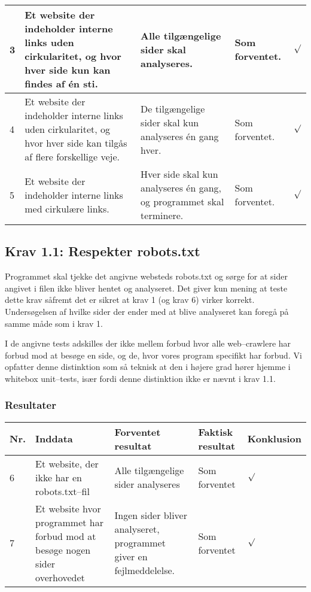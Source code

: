 \documentclass[a4paper,oneside,article]{memoir}
\begin{document}
\begin{landscape}
\begin{longtable}[c]{p{20pt}|p{220pt}|p{130pt}|p{130pt}|p{50pt}}
3 &
Et website der indeholder interne links uden cirkularitet, og
hvor hver side kun kan findes af én sti. &
Alle tilgængelige sider skal analyseres. &
Som forventet. &
$\surd$ \\ \hline

4 &
Et website der indeholder interne links uden cirkularitet, og hvor
hver side kan tilgås af flere forskellige veje. &
De tilgængelige sider skal kun analyseres én gang hver. &
Som forventet. &
$\surd$ \\ \hline

5 &
Et website der indeholder interne links med cirkulære links. &
Hver side skal kun analyseres én gang, og programmet skal
terminere. &
Som forventet. &
$\surd$

\end{longtable}

\subsection{Krav 1.1: Respekter robots.txt}

Programmet skal tjekke det angivne websteds robots.txt og sørge for at
sider angivet i filen ikke bliver hentet og analyseret. Det giver kun
mening at teste dette krav såfremt det er sikret at krav 1 (og krav 6)
virker korrekt. Undersøgelsen af hvilke sider der ender med at blive
analyseret kan foregå på samme måde som i krav 1.

I de angivne tests adskilles der ikke mellem forbud hvor alle
web--crawlere har forbud mod at besøge en side, og de, hvor vores
program specifikt har forbud. Vi opfatter denne distinktion som så
teknisk at den i højere grad hører hjemme i whitebox unit--tests, især
fordi denne distinktion ikke er nævnt i krav 1.1.

\subsubsection{Resultater}
\begin{longtable}[c]{p{20pt}|p{220pt}|p{130pt}|p{130pt}|p{50pt}}
\textbf{Nr.} &
\textbf{Inddata} &
\textbf{Forventet resultat} &
\textbf{Faktisk resultat} &
\textbf{Konklusion} \\ \hline

6 &
Et website, der ikke har en robots.txt--fil &
Alle tilgængelige sider analyseres &
Som forventet &
$\surd$ \\ \hline

7 &
Et website hvor programmet har forbud mod at besøge nogen sider
overhovedet &
Ingen sider bliver analyseret, programmet giver en fejlmeddelelse. &
Som forventet &
$\surd$ \\ \hline


\end{longtable}
\end{landscape}
\end{document}
